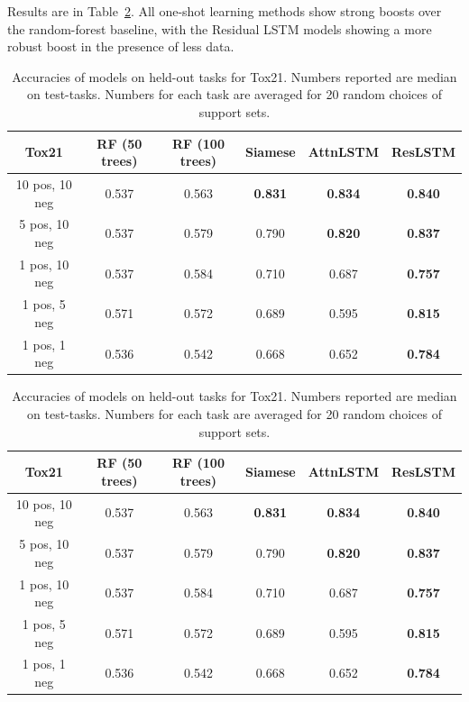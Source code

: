 \documentclass[journal=jacsat,manuscript=article]{achemso}
\begin{document}
Results are in Table~\ref{tab:tox21}. All one-shot learning methods show strong boosts over the random-forest baseline, with the Residual LSTM models showing a more robust boost in the presence of less data.
\begin{table}[h]
    \centering
    \begin{tabular}{ |c|c|c|c|c|c| } 
    \hline
    Tox21 & RF (50 trees) & RF (100 trees) & Siamese & AttnLSTM & ResLSTM \\ 
    \hline
    10 pos, 10 neg & 0.537 & 0.563 & \textbf{0.831} & \textbf{0.834} & \textbf{0.840} \\
    \hline
    5 pos, 10 neg & 0.537 & 0.579 & 0.790 & \textbf{0.820} & \textbf{0.837} \\ 
    \hline
    1 pos, 10 neg & 0.537 & 0.584 & 0.710 & 0.687 & \textbf{0.757} \\ 
    \hline
    1 pos, 5 neg & 0.571 & 0.572 & 0.689 & 0.595 & \textbf{0.815} \\ 
    \hline
    1 pos, 1 neg & 0.536 & 0.542 & 0.668 & 0.652 & \textbf{0.784}\\ 
    \hline
    \end{tabular}
    \caption{Accuracies of models on held-out tasks for Tox21. Numbers reported are median on test-tasks. Numbers for each task are averaged for 20 random choices of support sets.}
    \label{tab:tox21}
\end{table}
\begin{table}[h]
    \centering
    \begin{tabular}{ |c|c|c|c|c|c| } 
    \hline
    Tox21 & RF (50 trees) & RF (100 trees) & Siamese & AttnLSTM & ResLSTM \\ 
    \hline
    10 pos, 10 neg & 0.537 & 0.563 & \textbf{0.831} & \textbf{0.834} & \textbf{0.840} \\
    \hline
    5 pos, 10 neg & 0.537 & 0.579 & 0.790 & \textbf{0.820} & \textbf{0.837} \\ 
    \hline
    1 pos, 10 neg & 0.537 & 0.584 & 0.710 & 0.687 & \textbf{0.757} \\ 
    \hline
    1 pos, 5 neg & 0.571 & 0.572 & 0.689 & 0.595 & \textbf{0.815} \\ 
    \hline
    1 pos, 1 neg & 0.536 & 0.542 & 0.668 & 0.652 & \textbf{0.784}\\ 
    \hline
    \end{tabular}
    \caption{Accuracies of models on held-out tasks for Tox21. Numbers reported are median on test-tasks. Numbers for each task are averaged for 20 random choices of support sets.}
    \label{tab:tox21}
\end{table}
\end{document}

